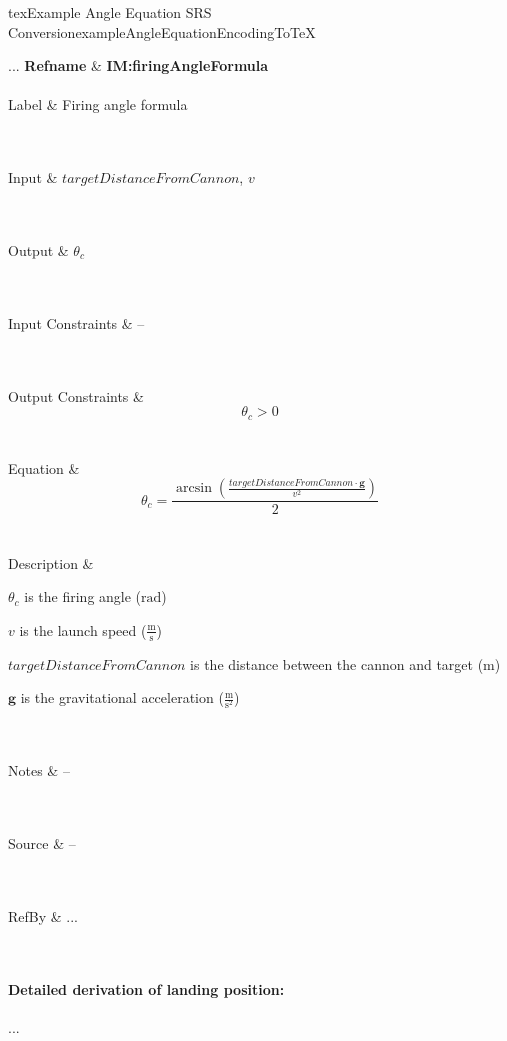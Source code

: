 \begin{pseudocode}{tex}{Example Angle Equation SRS Conversion}{exampleAngleEquationEncodingToTeX}
\begin{minipage}{\textwidth}
\begin{tabular}{...}
\toprule \textbf{Refname} & \textbf{IM:firingAngleFormula}
\label{IM:firingAngleFormula}
\\ \midrule \\
Label & Firing angle formula

\\ \midrule \\
Input & $\textit{targetDistanceFromCannon}$, $v$

\\ \midrule \\
Output & $\theta{}_c$
         
\\ \midrule \\
Input Constraints & --

\\ \midrule \\
Output Constraints & \begin{displaymath}
                     {\theta{}_c}\gt{}0
                     \end{displaymath}
\\ \midrule \\
Equation & \begin{displaymath}
           {\theta{}_c} = \frac{\arcsin{} (\frac{\textit{targetDistanceFromCannon} \cdot{} \mathbf{g}}{v^{2}})}{2}
           \end{displaymath}
\\ \midrule \\
Description & \begin{symbDescription}
              \item{${\theta{}_c}$ is the firing angle (${\text{rad}}$)}
              \item{${v}$ is the launch speed ($\frac{\text{m}}{\text{s}}$)}
              \item{$targetDistanceFromCannon$ is the distance between the cannon and target (${\text{m}}$)}
              \item{$\mathbf{g}$ is the gravitational acceleration ($\frac{\text{m}}{\text{s}^{2}}$)}
              \end{symbDescription}
\\ \midrule \\
Notes & --
        
\\ \midrule \\
Source & --
         
\\ \midrule \\
RefBy & ...

\\ \bottomrule
\end{tabular}
\end{minipage}
\paragraph{Detailed derivation of landing position:}
...
\end{pseudocode}
